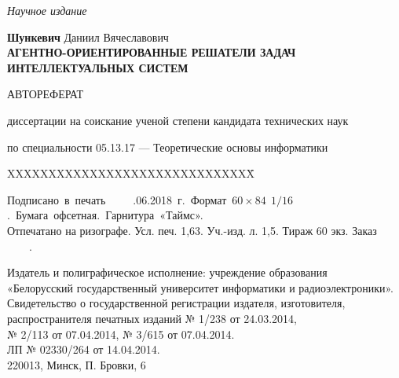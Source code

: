 \documentclass{thesisby}
\begin{document}
\newpage
\thispagestyle{empty}

\vspace* {0.5cm}

\begin{center}
\textit{Научное издание}

\vspace*{\fill}

\textbf{Шункевич} Даниил Вячеславович\\[25mm]
 {\large\bf АГЕНТНО-ОРИЕНТИРОВАННЫЕ РЕШАТЕЛИ ЗАДАЧ ИНТЕЛЛЕКТУАЛЬНЫХ СИСТЕМ\\}
 
\vspace* {2cm}

 
АВТОРЕФЕРАТ
 
диссертации на соискание ученой степени кандидата технических наук

\vspace* {1cm}

по специальности 05.13.17 — Теоретические основы информатики

\end{center}

\vspace*{\fill}\vspace*{\fill} \vspace*{\fill} \vspace*{\fill}
\begin{tabbing}
XXXXXXXXXXXXXXXXXXXXXXXXXXXXXX\= \kill
\end{tabbing}

\begin{center}

{\small \mbox{Подписано в печать ~~~~.06.2018 г. Формат $60\times84\ \  1/16$. Бумага офсетная. Гарнитура «Таймс».}\\
Отпечатано на ризографе. Усл. печ. 1,63. Уч.-изд. л. 1,5. Тираж 60 экз. Заказ ~~~~.

\bigskip

Издатель и полиграфическое исполнение: учреждение образования \\
«Белорусский государственный университет информатики и радиоэлектроники». \\
Свидетельство о государственной регистрации издателя, изготовителя, распространителя печатных изданий № 1/238 от 24.03.2014,\\ 
№ 2/113 от 07.04.2014, № 3/615 от 07.04.2014. \\
ЛП № 02330/264 от 14.04.2014.\\
220013, Минск, П. Бровки, 6}
\end{center}
\end{document}
